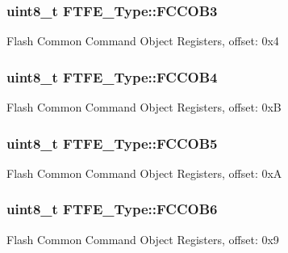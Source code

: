 \subsubsection[{\texorpdfstring{F\+C\+C\+O\+B3}{FCCOB3}}]{ uint8\+\_\+t F\+T\+F\+E\+\_\+\+Type\+::\+F\+C\+C\+O\+B3}\hypertarget{structFTFE__Type_a026658117f846dcdd32c059ebcdedd0d}{}\label{structFTFE__Type_a026658117f846dcdd32c059ebcdedd0d}
Flash Common Command Object Registers, offset\+: 0x4 
\subsubsection[{\texorpdfstring{F\+C\+C\+O\+B4}{FCCOB4}}]{ uint8\+\_\+t F\+T\+F\+E\+\_\+\+Type\+::\+F\+C\+C\+O\+B4}\hypertarget{structFTFE__Type_a9016f2712624c13b3f18889b3a40ebd3}{}\label{structFTFE__Type_a9016f2712624c13b3f18889b3a40ebd3}
Flash Common Command Object Registers, offset\+: 0xB 
\subsubsection[{\texorpdfstring{F\+C\+C\+O\+B5}{FCCOB5}}]{ uint8\+\_\+t F\+T\+F\+E\+\_\+\+Type\+::\+F\+C\+C\+O\+B5}\hypertarget{structFTFE__Type_aba801eccc7ec1fc44d81d7633b93f417}{}\label{structFTFE__Type_aba801eccc7ec1fc44d81d7633b93f417}
Flash Common Command Object Registers, offset\+: 0xA 
\subsubsection[{\texorpdfstring{F\+C\+C\+O\+B6}{FCCOB6}}]{ uint8\+\_\+t F\+T\+F\+E\+\_\+\+Type\+::\+F\+C\+C\+O\+B6}\hypertarget{structFTFE__Type_aa9fafcc37c56b515f19d564af3405fdb}{}\label{structFTFE__Type_aa9fafcc37c56b515f19d564af3405fdb}
Flash Common Command Object Registers, offset\+: 0x9 
